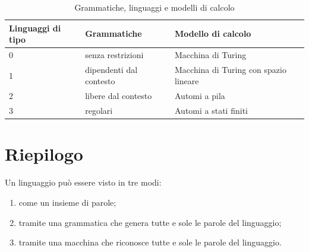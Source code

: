 \begin{table}[h!]\label{tab:linguaggi-modelli-grammatiche}
	\caption{Grammatiche, linguaggi e modelli di calcolo}
	\begin{tabular}{p{2.8cm} p{4.0cm} p{7.0cm}}
		\toprule
		Linguaggi di tipo & Grammatiche             & Modello di calcolo                    \\
		\midrule
		0                 & senza restrizioni       & Macchina di Turing                    \\
		1                 & dipendenti dal contesto & Macchina di Turing con spazio lineare \\
		2                 & libere dal contesto     & Automi a pila                         \\
		3                 & regolari                & Automi a stati finiti                 \\
		\bottomrule
	\end{tabular}
\end{table}

\section{Riepilogo}

Un linguaggio può essere visto in tre modi:
\begin{enumerate}
	\item come un insieme di parole;
	\item tramite una grammatica che genera tutte e sole le parole del linguaggio;
	\item tramite una macchina che riconosce tutte e sole le parole del linguaggio.

\end{enumerate}

